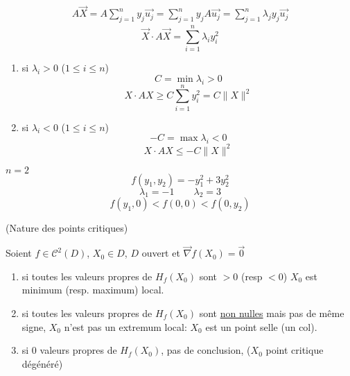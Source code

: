 \begin{align*}
    A\vec{X} = A \sum_{j=1}^{n} y_j\vec{u_j} = \sum_{j=1}^{n} y_jA\vec{u_j} = \sum_{j=1}^{n} \lambda_jy_j\vec{u_j}
\end{align*}
\[
    \vec{X} \cdot A\vec{X} = \sum_{i=1}^{n} \lambda_iy_i^2
\] 
\begin{enumerate}
    \item si $\lambda_i > 0$ ($1 \le i \le n$)
        \[
        C = \min \lambda_i > 0
        \] 
        \[
        X \cdot AX \ge C \sum_{i=1}^{n} y_i^2 = C \|X\|^2
        \] 
    \item si $\lambda_i < 0$ ($1 \le i \le n$)
        \[
        -C = \max \lambda_i < 0
        \] 
        \[
        X \cdot AX \le -C\|X\|^2
        \] 
\end{enumerate}
\begin{eg}
   $n = 2$ 
   \[
   f(y_1, y_2) = -y_1^2 + 3y_2^2
   \] 
   \[
   \lambda_1 = -1 \qquad \lambda_2 = 3
   \] 
   \[
   f(y_1, 0) < f(0, 0) < f(0, y_2)
   \] 
\end{eg}

\begin{theorem}\label{thm:nature-des-points-critiques}
    (Nature des points critiques) \par
    Soient $f \in \mathcal{C}^2(D)$,  $X_0 \in D$, $D$ ouvert et  $\vec{\nabla }f(X_0) = \vec{0}$
    \begin{enumerate}
        \item si toutes les valeurs propres de $H_f(X_0)$ sont $> 0$ (resp $< 0$) $X_0$ est minimum (resp. maximum) local.
        \item si toutes les valeurs propres de $H_f(X_0)$ sont \underline{non nulles} mais pas de même signe, $X_0$ n'est pas un extremum local: $X_0$ est un point selle (un col).
        \item si 0 valeurs propres de $H_f(X_0)$, pas de conclusion, ($X_0$ point critique dégénéré)
    \end{enumerate}
\end{theorem}

